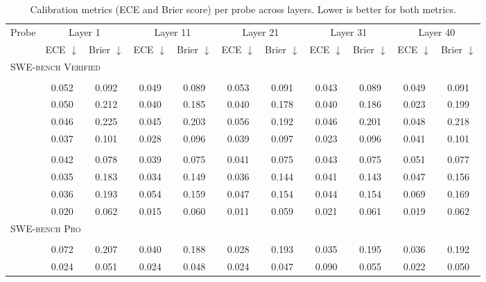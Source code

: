 \begin{table}[t]
\centering
\caption{Calibration metrics (ECE and Brier score) per probe across layers. Lower is better for both metrics.}
\label{tab:calibration}
\begin{tabular}{lcccccccccc}
\toprule
Probe & \multicolumn{2}{c}{Layer 1} & \multicolumn{2}{c}{Layer 11} & \multicolumn{2}{c}{Layer 21} & \multicolumn{2}{c}{Layer 31} & \multicolumn{2}{c}{Layer 40} \\
\cmidrule(lr){2-11}
& ECE $\downarrow$ & Brier $\downarrow$ & ECE $\downarrow$ & Brier $\downarrow$ & ECE $\downarrow$ & Brier $\downarrow$ & ECE $\downarrow$ & Brier $\downarrow$ & ECE $\downarrow$ & Brier $\downarrow$ \\
\midrule
\multicolumn{11}{l}{\textsc{SWE-bench Verified}} \\
\addlinespace[2pt]
\multicolumn{11}{l}{\quad\textit{Laguna-XS.2}} \\
\Syntactic{} & 0.052 & 0.092 & 0.049 & 0.089 & 0.053 & 0.091 & 0.043 & 0.089 & 0.049 & 0.091 \\
\Semantic{} & 0.050 & 0.212 & 0.040 & 0.185 & 0.040 & 0.178 & 0.040 & 0.186 & 0.023 & 0.199 \\
\RedFail{} & 0.046 & 0.225 & 0.045 & 0.203 & 0.056 & 0.192 & 0.046 & 0.201 & 0.048 & 0.218 \\
\Regressions{} & 0.037 & 0.101 & 0.028 & 0.096 & 0.039 & 0.097 & 0.023 & 0.096 & 0.041 & 0.101 \\
\addlinespace[3pt]
\multicolumn{11}{l}{\quad\textit{Qwen3.6-35B-A3B}} \\
\Syntactic{} & 0.042 & 0.078 & 0.039 & 0.075 & 0.041 & 0.075 & 0.043 & 0.075 & 0.051 & 0.077 \\
\Semantic{} & 0.035 & 0.183 & 0.034 & 0.149 & 0.036 & 0.144 & 0.041 & 0.143 & 0.047 & 0.156 \\
\RedFail{} & 0.036 & 0.193 & 0.054 & 0.159 & 0.047 & 0.154 & 0.044 & 0.154 & 0.069 & 0.169 \\
\Regressions{} & 0.020 & 0.062 & 0.015 & 0.060 & 0.011 & 0.059 & 0.021 & 0.061 & 0.019 & 0.062 \\
\midrule
\multicolumn{11}{l}{\textsc{SWE-bench Pro}} \\
\addlinespace[2pt]
\multicolumn{11}{l}{\quad\textit{Laguna-XS.2}} \\
\Syntactic{} & 0.072 & 0.207 & 0.040 & 0.188 & 0.028 & 0.193 & 0.035 & 0.195 & 0.036 & 0.192 \\
\Semantic{} & 0.024 & 0.051 & 0.024 & 0.048 & 0.024 & 0.047 & 0.090 & 0.055 & 0.022 & 0.050 \\

\end{tabular}
\end{table}
